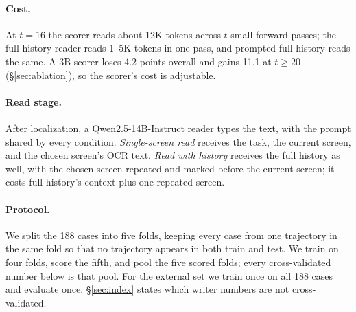 \paragraph{Cost.} At $t=16$ the scorer reads about 12K tokens across $t$ small forward passes; the full-history reader reads 1--5K tokens in one pass, and prompted full history reads the same. A 3B scorer loses 4.2 points overall and gains 11.1 at $t\ge20$ (\S\ref{sec:ablation}), so the scorer's cost is adjustable.

\paragraph{Read stage.} After localization, a Qwen2.5-14B-Instruct reader types the text, with the prompt shared by every condition. \emph{Single-screen read} receives the task, the current screen, and the chosen screen's OCR text. \emph{Read with history} receives the full history as well, with the chosen screen repeated and marked before the current screen; it costs full history's context plus one repeated screen.

\paragraph{Protocol.} We split the 188 cases into five folds, keeping every case from one trajectory in the same fold so that no trajectory appears in both train and test. We train on four folds, score the fifth, and pool the five scored folds; every cross-validated number below is that pool. For the external set we train once on all 188 cases and evaluate once. \S\ref{sec:index} states which writer numbers are not cross-validated.
